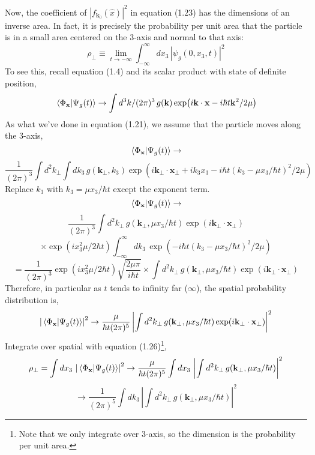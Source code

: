 \documentclass[12pt]{article}
\numberwithin{equation}{section}
\begin{document}
Now, the coefficient of $|f_{\mathbf{k}_0}(\hat{x})|^2$ in equation (1.23) has the dimensions of an inverse area. In fact, it is precisely the probability per unit area that the particle is in a small area centered on the 3-axis and normal to that axis:
\begin{equation}
    \rho_{\perp}\equiv\lim_{t\rightarrow-\infty}\int_{-\infty}^{\infty}{dx_{3}\,\left|\psi_{g}(0, x_3, t)\right|^2}
\end{equation}
To see this, recall equation (1.4) and its scalar product with state of definite position,
\[\braket*{\Phi_{\mathbf{x}}}{\Psi_{g}(t)}\rightarrow\int{d^3k/(2\pi)^3\,g(\mathbf{k})\exp(i\mathbf{k}\cdot\mathbf{x}-i\hbar t\mathbf{k}^2/2\mu)}\]
As what we've done in equation (1.21), we assume that the particle moves along the 3-axis,
\[\braket*{\Phi_{\mathbf{x}}}{\Psi_{g}(t)}\rightarrow\]\[\frac{1}{(2\pi)^3}\int{d^2k_{\perp}}\int{dk_3\,g(\mathbf{k}_{\perp}, k_3)\exp\left(i\mathbf{k}_{\perp}\cdot\mathbf{x}_{\perp}+ik_3x_3-i\hbar t(k_3-\mu x_3/\hbar t)^2/2\mu\right)}\]
Replace $k_3$ with $k_3 = \mu x_3/\hbar t$ except the exponent term.
\[\braket*{\Phi_{\mathbf{x}}}{\Psi_{g}(t)}\rightarrow\]
\[\frac{1}{(2\pi)^3}\int{d^2k_{\perp}\,g(\mathbf{k}_{\perp}, \mu x_3/\hbar t)}\exp(i\mathbf{k}_{\perp}\cdot\mathbf{x}_{\perp})\]
\[\times\exp(ix^2_3\mu/2\hbar t)\int_{-\infty}^{\infty}{dk_3\,\exp\left(-i\hbar t (k_3-\mu x_3/\hbar t)^2/2\mu\right)}\]
\begin{equation}
    =\frac{1}{(2\pi)^3}\exp(ix^2_3\mu/2\hbar t)\sqrt{\frac{2\mu\pi}{i\hbar t}}\times\int{d^2k_{\perp}\,g(\mathbf{k}_{\perp},\mu x_3/\hbar t)\exp(i\mathbf{k}_{\perp}\cdot\mathbf{x}_{\perp})}
\end{equation}
Therefore, in particular as $t$ tends to infinity far ($\infty$), the spatial probability distribution is,
\begin{equation}
    \left|\braket*{\Phi_{\mathbf{x}}}{\Psi_{g}(t)}\right|^2\rightarrow\frac{\mu}{\hbar t(2\pi)^5}\left|\int{d^2k_{\perp}\,g(\mathbf{k}_{\perp}, \mu x_3/\hbar t)\exp(i\mathbf{k}_{\perp}\cdot\mathbf{x}_{\perp})}\right|^2
\end{equation}
Integrate over spatial with equation (1.26)\footnote{Note that we only integrate over 3-axis, so the dimension is the probability per unit area.},
\[\rho_{\perp} = \int{dx_3\,\left|\braket*{\Phi_{\mathbf{x}}}{\Psi_{g}(t)}\right|^2} \rightarrow  \frac{\mu}{\hbar t(2\pi)^5}\int{dx_3\,}\left|\int{d^2k_{\perp}\,g(\mathbf{k}_{\perp}, \mu x_3/\hbar t)}\right|^2\]
\[\rightarrow\frac{1}{(2\pi)^5}\int{dk_3\,\left|\int{d^2k_{\perp}\,g(\mathbf{k}_{\perp}, \mu x_3/\hbar t)}\right|^2}\]
\end{document}
